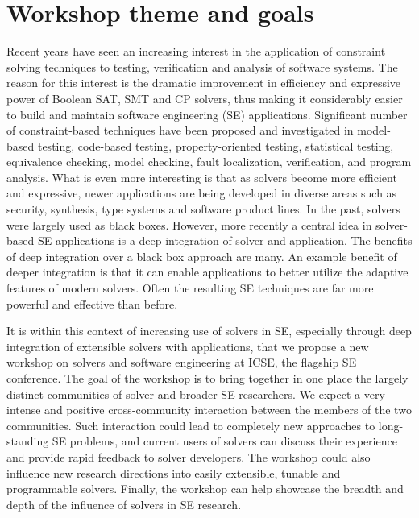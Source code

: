 \documentclass{sig-alternate}
\begin{document}
\section{Workshop theme and goals}
\vspace{0.2cm} Recent years have seen an increasing interest in the
application of constraint solving techniques to testing, verification
and analysis of software systems. The reason for this interest is the
dramatic improvement in efficiency and expressive power of Boolean
SAT, SMT and CP solvers, thus making it considerably easier to build
and maintain software engineering (SE) applications. Significant
number of constraint-based techniques have been proposed and
investigated in model-based testing, code-based testing,
property-oriented testing, statistical testing, equivalence checking,
model checking, fault localization, verification, and program
analysis.  What is even more interesting is that as solvers become
more efficient and expressive, newer applications are being developed
in diverse areas such as security, synthesis, type systems and
software product lines. In the past, solvers were largely used as
black boxes. However, more recently a central idea in solver-based SE
applications is a deep integration of solver and application. The
benefits of deep integration over a black box approach are many. An
example benefit of deeper integration is that it can enable
applications to better utilize the adaptive features of modern
solvers. Often the resulting SE techniques are far more powerful and
effective than before.

\vspace{0.2cm} It is within this context of increasing use of solvers
in SE, especially through deep integration of extensible solvers with
applications, that we propose a new workshop on solvers and software
engineering at ICSE, the flagship SE conference. The goal of the
workshop is to bring together in one place the largely distinct
communities of solver and broader SE researchers. We expect a very
intense and positive cross-community interaction between the members
of the two communities. Such interaction could lead to completely new
approaches to long-standing SE problems, and current users of solvers
can discuss their experience and provide rapid feedback to solver
developers. The workshop could also influence new research directions
into easily extensible, tunable and programmable solvers. Finally, the
workshop can help showcase the breadth and depth of the influence of
solvers in SE research.
\end{document}
